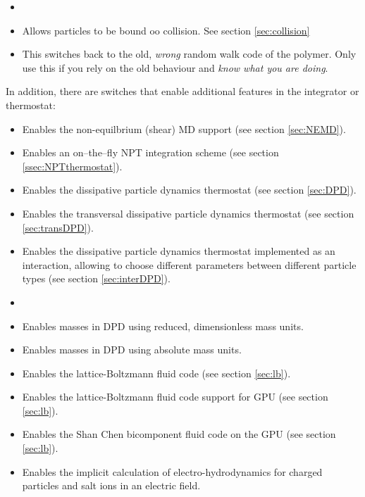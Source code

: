 \begin{itemize}
\item {}
\item {} Allows particles to be bound oo collision. See section \ref{sec:collision}
\item {} This switches back to the old,
  \emph{wrong} random walk code of the polymer. Only use this if you
  rely on the old behaviour and \emph{know what you are doing}.
\end{itemize}

In addition, there are switches that enable additional features in the
integrator or thermostat:
\begin{itemize}
\item {} Enables the non-equilbrium (shear) MD support
  (see section \vref{sec:NEMD}).
\item {} Enables an on--the--fly NPT integration scheme
  (see section \vref{ssec:NPTthermostat}).
\item {} Enables the dissipative particle dynamics
  thermostat (see section \vref{sec:DPD}).
\item {} Enables the transversal dissipative
  particle dynamics thermostat (see section \vref{sec:transDPD}).
\item {} Enables the dissipative
  particle dynamics thermostat implemented as an interaction,
  allowing to choose different parameters between different particle
  types (see section \vref{sec:interDPD}).
\item {} 
\item {} Enables masses in DPD using reduced,
  dimensionless mass units.
\item {} Enables masses in DPD using absolute
  mass units.
\item {} Enables the lattice-Boltzmann fluid code (see
  section \vref{sec:lb}).
\item {} Enables the lattice-Boltzmann fluid code support for GPU (see
  section \vref{sec:lb}).
\item {} Enables the Shan Chen bicomponent fluid code on the GPU (see
  section \vref{sec:lb}).
\item {} Enables the implicit
  calculation of electro-hydrodynamics for charged particles and salt
  ions in an electric field.
\end{itemize}

